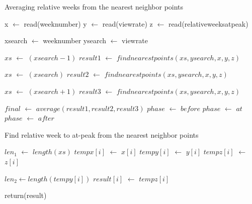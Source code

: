 \documentclass[10pt,final,journal,a4paper]{IEEEtran}
\begin{document}
\begin{algorithm}
\caption{Averaging relative weeks from the nearest neighbor points}
\label{alg2}
\begin{algorithmic}[1]

\STATE x $\leftarrow$ read(weeknumber) 
\STATE y $\leftarrow$ read(viewrate) 
\STATE z $\leftarrow$ read(relativeweeksatpeak) 

\STATE xsearch $\leftarrow$ weeknumber 
\STATE ysearch $\leftarrow$ viewrate 


\STATE $xs$ $\leftarrow$ $(xsearch - 1)$ 
\STATE $result1$ $\leftarrow$ $findnearestpoints(xs,ysearch,x,y,z)$

\STATE $xs$ $\leftarrow$ $(xsearch)$ 
\STATE $result2$ $\leftarrow$ $findnearestpoints(xs,ysearch,x,y,z)$

\STATE $xs$ $\leftarrow$ $(xsearch+1)$ 
\STATE $result3$ $\leftarrow$ $findnearestpoints(xs,ysearch,x,y,z)$


\STATE $final$ $\leftarrow$ $average(result1,result2,result3)$
\STATE $phase$ $\leftarrow$ $before$
\STATE $phase$ $\leftarrow$ $at$
\ELSE
\STATE $phase$ $\leftarrow$ $after$
\ENDIF

\end{algorithmic}
\end{algorithm}


\begin{algorithm}
\caption{Find relative week to at-peak from the nearest neighbor points}
\label{alg3}
\begin{algorithmic}[1]

\STATE $len_1$ $\leftarrow$ $length(xs)$
\STATE $tempx[i]$ $\leftarrow$ $x[i]$
\STATE $tempy[i]$ $\leftarrow$ $y[i]$
\STATE $tempz[i]$ $\leftarrow$ $z[i]$
\ENDIF
\ENDFOR

\STATE $len_2 \leftarrow length(tempy[i])$
    \STATE $result[i]$ $\leftarrow$ $tempz[i]$ 
    \ENDIF
\ENDFOR

\STATE return(result)
\end{algorithmic}
\end{algorithm}
\end{document}
